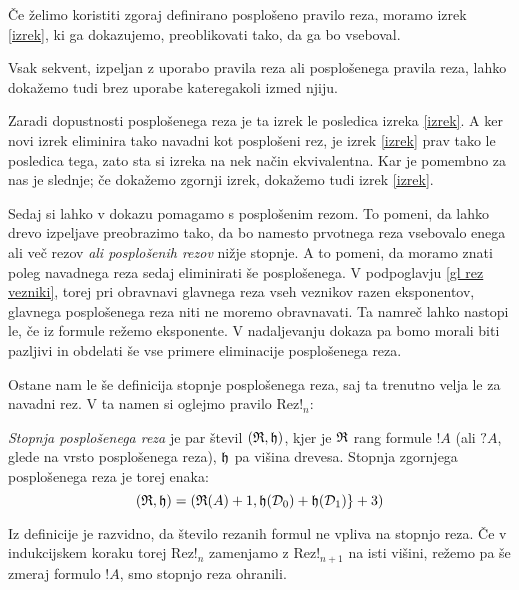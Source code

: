 Če želimo koristiti zgoraj definirano posplošeno pravilo reza, moramo izrek \ref{izrek}, ki ga dokazujemo, preoblikovati tako, da ga bo vseboval.
\begin{izrek}
    Vsak sekvent, izpeljan z uporabo pravila reza ali posplošenega pravila reza, lahko dokažemo tudi brez uporabe kateregakoli izmed njiju.
\end{izrek}

Zaradi dopustnosti posplošenega reza je ta izrek le posledica izreka \ref{izrek}. A ker novi izrek eliminira tako navadni kot posplošeni rez, je izrek \ref{izrek} prav tako le posledica tega, zato sta si izreka na nek način ekvivalentna. Kar je pomembno za nas je slednje; če dokažemo zgornji izrek, dokažemo tudi izrek \ref{izrek}.

Sedaj si lahko v dokazu pomagamo s posplošenim rezom. To pomeni, da lahko drevo izpeljave preobrazimo tako, da bo namesto prvotnega reza vsebovalo enega ali več rezov \emph{ali posplošenih rezov} nižje stopnje. A to pomeni, da moramo znati poleg navadnega reza sedaj eliminirati še posplošenega. V podpoglavju \ref{gl rez vezniki}, torej pri obravnavi glavnega reza vseh veznikov razen eksponentov, glavnega posplošenega reza niti ne moremo obravnavati. Ta namreč lahko nastopi le, če iz formule režemo eksponente. V nadaljevanju dokaza pa bomo morali biti pazljivi in obdelati še vse primere eliminacije posplošenega reza.

Ostane nam le še definicija stopnje posplošenega reza, saj ta trenutno velja le za navadni rez. V ta namen si oglejmo pravilo Rez!$_n$:
\begin{prooftree}
\end{prooftree}

\begin{definicija}
    \emph{Stopnja posplošenega reza} je par števil $(\R,\h)$, kjer je $\R$ rang formule $!A$ (ali $?A$, glede na vrsto posplošenega reza), $\h$ pa višina drevesa. Stopnja zgornjega posplošenega reza je torej enaka:
    $$
        (\R,\h) = (\R(A) + 1, \h(\D_0) + \h(\D_1)\} + 3)
    $$
\end{definicija}
\begin{opomba}
    Iz definicije je razvidno, da število rezanih formul ne vpliva na stopnjo reza. Če v indukcijskem koraku torej Rez!$_n$ zamenjamo z Rez!$_{n+1}$ na isti višini, režemo pa še zmeraj formulo $!A$, smo stopnjo reza ohranili.
\end{opomba}

